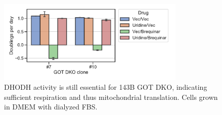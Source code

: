 \begin{figure}[ht]
    \centering
    \includegraphics[width=0.8\textwidth]{figures/sapp/DKO_char/143B_DKO_brequinar.pdf}
    \caption[143B GOT DKO DHODH inhibitor sensitivity.]{
    DHODH activity is still essential for 143B GOT DKO, indicating sufficient respiration and thus mitochondrial translation.
    Cells grown in DMEM with dialyzed FBS.
    }
    \label{fig:sapp:DKO_char:143B_DKO_brequinar}
\end{figure}






